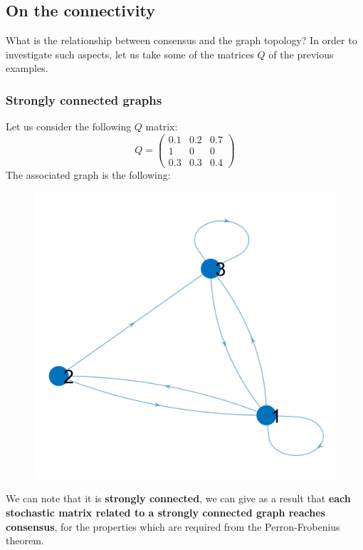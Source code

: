 \subsection{On the connectivity}
What is the relationship between consensus and the graph topology? In order to investigate such aspects, let us take some of the matrices $Q$ of the previous examples.

{\color{blue}\subsubsection{Strongly connected graphs}}
Let us consider the following $Q$ matrix:
\begin{equation*}
    Q=\begin{pmatrix}
        0.1&0.2&0.7\\1&0&0\\0.3&0.3&0.4
    \end{pmatrix}
\end{equation*}
The associated graph is the following: 
\begin{figure}[h]
    \centering
    \includegraphics[scale=0.6]{images/Es1_gr.png}
\end{figure}
\noindent
We can note that it is \textbf{strongly connected}, we can give as a result that 
\textbf{each stochastic matrix related to a strongly connected graph reaches consensus}, for the properties which are required from the Perron-Frobenius theorem.

